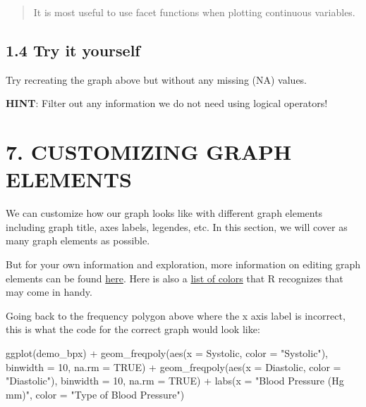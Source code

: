 \documentclass[
]{book}
\newenvironment{Shaded}{\begin{snugshade}}{\end{snugshade}}
\newcommand{\AttributeTok}[1]{\textcolor[rgb]{0.77,0.63,0.00}{#1}}
\newcommand{\ConstantTok}[1]{\textcolor[rgb]{0.00,0.00,0.00}{#1}}
\newcommand{\DecValTok}[1]{\textcolor[rgb]{0.00,0.00,0.81}{#1}}
\newcommand{\FunctionTok}[1]{\textcolor[rgb]{0.00,0.00,0.00}{#1}}
\newcommand{\NormalTok}[1]{#1}
\newcommand{\SpecialCharTok}[1]{\textcolor[rgb]{0.00,0.00,0.00}{#1}}
\newcommand{\StringTok}[1]{\textcolor[rgb]{0.31,0.60,0.02}{#1}}
\begin{document}
\begin{quote}
It is most useful to use facet functions when plotting continuous variables.
\end{quote}

\hypertarget{try-it-yourself-26}{%
\subsection{1.4 Try it yourself}\label{try-it-yourself-26}}

Try recreating the graph above but without any missing (NA) values.

\textbf{HINT}: Filter out any information we do not need using logical operators!

\hypertarget{customizing-graph-elements}{%
\section{7. CUSTOMIZING GRAPH ELEMENTS}\label{customizing-graph-elements}}

We can customize how our graph looks like with different graph elements including graph title, axes labels, legendes, etc. In this section, we will cover as many graph elements as possible.

But for your own information and exploration, more information on editing graph elements can be found \href{http://environmentalcomputing.net/plotting-with-ggplot-adding-titles-and-axis-names/}{here}. Here is also a \href{http://www.stat.columbia.edu/~tzheng/files/Rcolor.pdf}{list of colors} that R recognizes that may come in handy.

Going back to the frequency polygon above where the x axis label is incorrect, this is what the code for the correct graph would look like:

\begin{Shaded}
\begin{Highlighting}[]
\FunctionTok{ggplot}\NormalTok{(demo\_bpx) }\SpecialCharTok{+} 
    \FunctionTok{geom\_freqpoly}\NormalTok{(}\FunctionTok{aes}\NormalTok{(}\AttributeTok{x =}\NormalTok{ Systolic, }\AttributeTok{color =} \StringTok{"Systolic"}\NormalTok{), }\AttributeTok{binwidth =} \DecValTok{10}\NormalTok{, }\AttributeTok{na.rm =} \ConstantTok{TRUE}\NormalTok{) }\SpecialCharTok{+}
    \FunctionTok{geom\_freqpoly}\NormalTok{(}\FunctionTok{aes}\NormalTok{(}\AttributeTok{x =}\NormalTok{ Diastolic, }\AttributeTok{color =} \StringTok{"Diastolic"}\NormalTok{), }\AttributeTok{binwidth =} \DecValTok{10}\NormalTok{, }\AttributeTok{na.rm =} \ConstantTok{TRUE}\NormalTok{) }\SpecialCharTok{+}
    \FunctionTok{labs}\NormalTok{(}\AttributeTok{x =} \StringTok{"Blood Pressure (Hg mm)"}\NormalTok{, }\AttributeTok{color =} \StringTok{"Type of Blood Pressure"}\NormalTok{)}
\end{Highlighting}
\end{Shaded}
\end{document}
